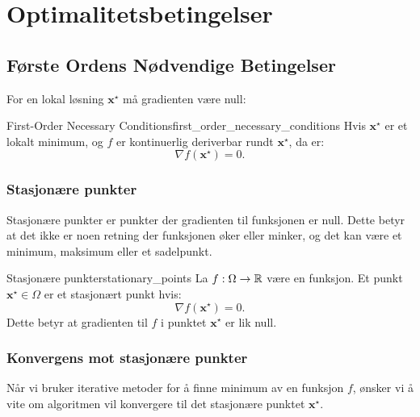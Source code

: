 \section{Optimalitetsbetingelser}

\subsection{Første Ordens Nødvendige Betingelser}

For en lokal løsning \(\mathbf{x}^\star\) må gradienten være null:

\begin{theorem}{First-Order Necessary Conditions}{first_order_necessary_conditions}
	Hvis \(\mathbf{x}^\star\) er et lokalt minimum, og \(f\) er kontinuerlig deriverbar rundt \(\mathbf{x}^\star\), da er:
	\[
		\nabla f(\mathbf{x}^\star) = 0.
	\]
\end{theorem}

\subsubsection{Stasjonære punkter}
Stasjonære punkter er punkter der gradienten til funksjonen er null. Dette betyr at det ikke er noen retning der funksjonen øker eller minker, og det kan være et minimum, maksimum eller et sadelpunkt.

\begin{corollary}{Stasjonære punkter}{stationary_points}
	La \(f: \Omega \to \mathbb{R}\) være en funksjon. Et punkt \(\symbf{x}^\star \in \Omega\) er et stasjonært punkt hvis:
	\[
		\nabla f(\symbf{x}^\star) = 0.
	\]
	Dette betyr at gradienten til \(f\) i punktet \(\symbf{x}^\star\) er lik null.
\end{corollary}

\subsubsection{Konvergens mot stasjonære punkter}
Når vi bruker iterative metoder for å finne minimum av en funksjon \(f\), ønsker vi å vite om algoritmen vil konvergere til det stasjonære punktet \(\symbf{x}^\star\).

